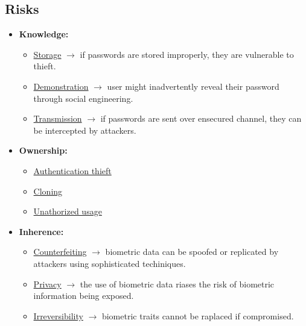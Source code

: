 \subsection{Risks}
\begin{itemize}
    \item \textbf{Knowledge:}
    \begin{itemize}
        \item \underline{Storage} \(\rightarrow \) if passwords are stored improperly, they are vulnerable to thieft. 
        \item \underline{Demonstration} \(\rightarrow\) user might inadvertently reveal their password through social engineering.
        \item \underline{Transmission} \(\rightarrow\) if passwords are sent over ensecured channel, they can be intercepted by attackers. 
    \end{itemize}
    \item \textbf{Ownership:}
    \begin{itemize}
        \item \underline{Authentication thieft}
        \item \underline{Cloning}
        \item \underline{Unathorized usage}
    \end{itemize}
    \item \textbf{Inherence:}
    \begin{itemize}
        \item \underline{Counterfeiting} \(\rightarrow\) biometric data can be spoofed or replicated by attackers using sophisticated techiniques.
        \item \underline{Privacy} \(\rightarrow\) the use of biometric data riases the risk of biometric information being exposed.
        \item \underline{Irreversibility} \(\rightarrow\) biometric traits cannot be raplaced if compromised. 
    \end{itemize}
\end{itemize}

